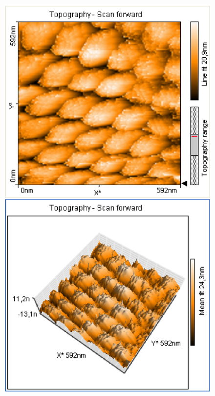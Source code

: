 \documentclass[12pt]{article}
\begin{document}
\begin{figure}[H]
\begin{minipage}{0.4\linewidth}
\centering
\includegraphics[width=0.9\linewidth]{../plot/data/goldgitter/goldgitter2.eps}
\end{minipage}
\end{figure}
\end{document}
